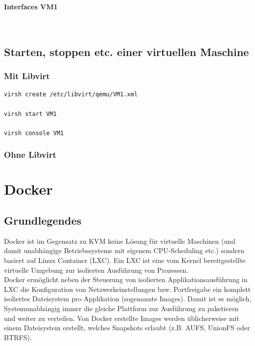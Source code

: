 
\paragraph{Interfaces VM1} \hfill \\

\subsection{Starten, stoppen etc. einer virtuellen Maschine}

\subsubsection{Mit Libvirt}


\begin{lstlisting}[language=bash]
virsh create /etc/libvirt/qemu/VM1.xml

virsh start VM1 

virsh console VM1
\end{lstlisting}

\subsubsection{Ohne Libvirt}



\section{Docker}
\subsection{Grundlegendes}
Docker ist im Gegensatz zu KVM keine Lösung für virtuelle Maschinen (und damit unabhängige Betriebssysteme mit eigenem CPU-Scheduling etc.) sondern basiert auf Linux Container (LXC). Ein LXC ist eine vom Kernel bereitgestellte virtuelle Umgebung zur isolierten Ausführung von Prozessen. \\

Docker ermöglicht neben der Steuerung von isolierten Applikationsausführung in LXC die Konfiguration von Netzwerkeinstellungen bzw. Portfreigabe ein komplett isoliertes Dateisystem pro Applikation (sogenannte Images). Damit ist es möglich, Systemunabhängig immer die gleiche Plattform zur Ausführung zu paketieren und weiter zu verteilen. Von Docker erstellte Images werden üblicherweise mit einem Dateisystem erstellt, welches Snapshots erlaubt (z.B. AUFS, UnionFS oder BTRFS). \\

